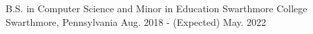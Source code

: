 

\begin{cveducation}

  \cveduc
    {B.S. in Computer Science and Minor in Education} %
    {Swarthmore College} %
    {Swarthmore, Pennsylvania} %
    {Aug. 2018 - (Expected) May. 2022} %

\end{cveducation}
